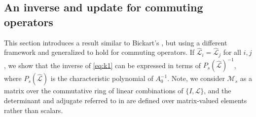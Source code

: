 \documentclass[review]{siamart}
\begin{document}
\subsection{An inverse and update for commuting operators}\label{sec:solve:inv}

This section introduces a result similar to Bickart's \cite{bickart77},
but using a different framework and generalized to hold for commuting
operators. If $\widehat{\mathcal{L}}_i=\widehat{\mathcal{L}}_j$ for all $i,j$, we show that
the inverse of \eqref{eq:k1} can be expressed in terms of $P_s(\widehat{\mathcal{L}})^{-1}$,
where $P_s(\widehat{\mathcal{L}})$ is the characteristic polynomial of $A_0^{-1}$. Note, we
consider $\mathcal{M}_s$ as a matrix over the commutative ring of linear combinations of
$\{I, \mathcal{L}\}$, and the determinant and adjugate referred to in
 are defined over matrix-valued elements rather than scalars.
\end{document}
